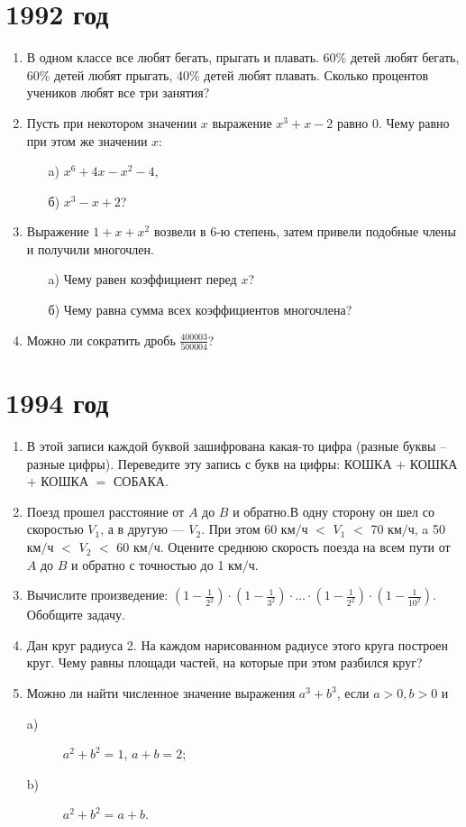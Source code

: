 \documentclass[12pt]{article}
\begin{document}
\section*{1992 год}

\begin{enumerate}
    \item В одном классе все любят бегать, прыгать и плавать. 60\% детей любят
    бегать, 60\% детей любят прыгать, 40\% детей любят плавать. Сколько
    процентов учеников любят все три занятия?
    \item Пусть при некотором значении $x$ выражение $x^3+x-2$ равно $0$. Чему
    равно при этом же значении $x$:
    \begin{enumerate}
        \item[a)] $x^6+4x-x^2-4$,  
        \item[б)] $x^3-x+2$?
    \end{enumerate}
    \item Выражение $1+x+x^2$ возвели в 6-ю степень, затем привели подобные
    члены и получили многочлен.
    \begin{enumerate}
        \item[a)] Чему равен коэффициент перед $x$?  
        \item[б)] Чему равна сумма всех коэффициентов многочлена?
    \end{enumerate}
    \item Можно ли сократить дробь $\frac{400003}{500004}$?
\end{enumerate}
\section*{1994 год}
\begin{enumerate}
\item В этой записи каждой буквой зашифрована какая-то цифра (разные буквы – разные цифры). Переведите эту запись с букв на цифры: КОШКА $+$ КОШКА $+$ КОШКА $=$ СОБАКА.
\item Поезд прошел расстояние от $A$ до $B$ и обратно.В одну сторону он шел со скоростью $V_1$, а в другую --- $V_2$. При этом 60 км$/$ч $<$ $V_1$ $<$ 70 км$/$ч, a 50 км$/$ч $<$ $V_2$ $<$ 60 км$/$ч. Оцените среднюю скорость поезда на всем пути от $A$ до $B$ и обратно с точностью до 1 км$/$ч.
\item Вычислите произведение: $\left(1-\frac{1}{2^2}\right)\cdot\left(1-\frac{1}{3^2}\right)\cdot\ldots\cdot\left(1-\frac{1}{2^2}\right)\cdot\left(1-\frac{1}{10^2}\right)$. Обобщите задачу.
\item Дан круг радиуса 2. На каждом нарисованном радиусе этого круга построен круг. Чему равны площади частей, на которые при этом разбился круг? 
\item Можно ли найти численное значение выражения $a^3 + b^3$, если \mbox{$a>0,b>0$} и
\begin{description}
\item[a)] $a^2+b^2 = 1$, $a+b=2$;
\item[b)] $a^2+b^2 = a + b$.
\end{description}

\end{enumerate}
\end{document}
